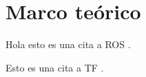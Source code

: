 \chapter{Marco teórico}

Hola esto es una cita a ROS \cite{quigley2009}.


Esto es una cita a TF \cite{foote2013}.

